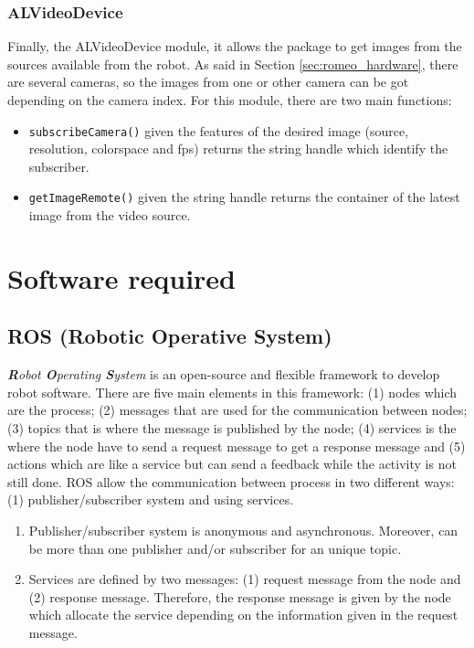 \documentclass[12pt,a4paper,final,twoside,openright]{report}
\begin{document}
\subsubsection{ALVideoDevice}

Finally, the ALVideoDevice module, it allows the package to get images from the sources available from the robot. As said in Section \ref{sec:romeo_hardware}, there are several cameras, so the images from one or other camera can be got depending on the camera index. For this module, there are two main functions:

\begin{itemize}
\item \texttt{subscribeCamera()} given the features of the desired image (source, resolution, colorspace and fps) returns the string handle which identify the subscriber.
\item \texttt{getImageRemote()} given the string handle returns the container of the latest image from the video source.
\end{itemize}


\section{Software required}

\subsection{ROS (Robotic Operative System)}
\label{sec:ROS}

\textit{\textbf{R}obot \textbf{O}perating \textbf{S}ystem} \cite{ROS} is an open-source and flexible framework to develop robot software. There are five main elements in this framework: (1) nodes which are the process; (2) messages that are used for the communication between nodes; (3) topics that is where the message is published by the node; (4) services is the where the node have to send a request message to get a response message and (5) actions which are like a service but can send a feedback while the activity is not still done. ROS allow the communication between process in two different ways: (1) publisher/subscriber system and using services. 

\begin{enumerate}
\item Publisher/subscriber system is anonymous and asynchronous. Moreover, can be more than one publisher and/or subscriber for an unique topic.
\item Services are defined by two messages: (1) request message from the node and (2) response message. Therefore, the response message is given by the node which allocate the service depending on the information given in the request message. 
\end{enumerate}
\end{document}
